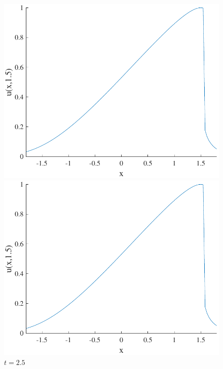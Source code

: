 \documentclass{article}
\begin{document}
\begin{figure}[H]
  \centering
  \begin{minipage}[b]{0.49\textwidth}
    \includegraphics[width=\textwidth]{hw_13_plot6.pdf}
    \caption{$t = 1.5$}

  \end{minipage}
  \hfill
  \begin{minipage}[b]{0.49\textwidth}
    \includegraphics[width=\textwidth]{hw_13_plot6.pdf}
    \caption{$t = 2.5$}

  \end{minipage}
    \hfill
\end{figure}
\end{document}
